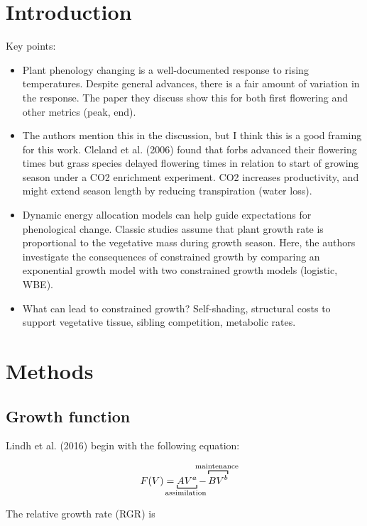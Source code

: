 \documentclass[12pt, oneside]{article}   	%
\begin{document}
 

\section{Introduction}

Key points:

\begin{itemize}
\item Plant phenology changing is a well-documented response to rising temperatures. Despite general advances, there is a fair amount of variation in the response. The paper they discuss show this for both first flowering and other metrics (peak, end).
\item The authors mention this in the discussion, but I think this is a good framing for this work. Cleland et al. (2006) found that forbs advanced their flowering times but grass species delayed flowering times in relation to start of growing season under a CO2 enrichment experiment. CO2 increases productivity, and might extend season length by reducing transpiration (water loss). 
\item Dynamic energy allocation models can help guide expectations for phenological change. Classic studies assume that plant growth rate is proportional to the vegetative mass during growth season. Here, the authors investigate the consequences of constrained growth by comparing an exponential  growth model with two constrained growth models (logistic, WBE).
\item What can lead to constrained growth? Self-shading, structural costs to support vegetative tissue, sibling competition, metabolic rates.
\end{itemize}

\section{Methods}
\subsection{Growth function}

\noindent Lindh et al. (2016) begin with the following equation: 

\begin{align}
F(V) = \underbracket[0.8pt]{ AV^a }_\text{\clap{assimilation~}} - \overbracket[0.8pt]{BV^b}^\text{\clap{maintenance~}} \nonumber 
\end{align}

The relative growth rate (RGR) is 
\end{document}
